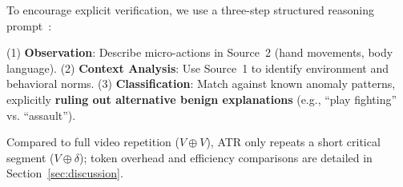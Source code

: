 To encourage explicit verification, we use a three-step structured reasoning prompt~\cite{wang2022self,yao2023tree}:


(1) \textbf{Observation}: Describe micro-actions in Source~2 (hand movements, body language).
(2) \textbf{Context Analysis}: Use Source~1 to identify environment and behavioral norms.
(3) \textbf{Classification}: Match against known anomaly patterns, explicitly \textbf{ruling out alternative benign explanations} (e.g., ``play fighting'' vs. ``assault'').

Compared to full video repetition ($V \oplus V$), ATR only repeats a short critical segment
($V \oplus \delta$); token overhead and efficiency comparisons are detailed in
Section~\ref{sec:discussion}.

